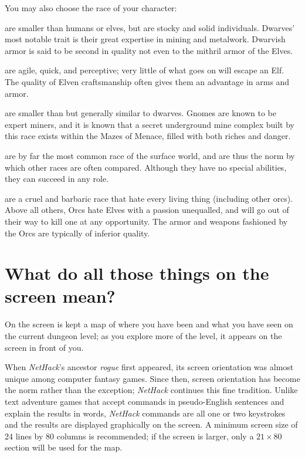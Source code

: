 You may also choose the race of your character:

%
\blist{}
\item[\bb{Dwarves}]%
are smaller than humans or elves, but are stocky and solid
individuals.  Dwarves' most notable trait is their great expertise in mining
and metalwork.  Dwarvish armor is said to be second in quality not even to the
mithril armor of the Elves.
%
\item[\bb{Elves}]%
are agile, quick, and perceptive; very little of what goes
on will escape an Elf.  The quality of Elven craftsmanship often gives
them an advantage in arms and armor.
%
\item[\bb{Gnomes}]%
are smaller than but generally similar to dwarves.  Gnomes are
known to be expert miners, and it is known that a secret underground mine
complex built by this race exists within the Mazes of Menace, filled with
both riches and danger.
%
\item[\bb{Humans}]%
are by far the most common race of the surface world, and
are thus the norm by which other races are often compared.  Although
they have no special abilities, they can succeed in any role.
%
\item[\bb{Orcs}]%
are a cruel and barbaric race that hate every living thing
(including other orcs).  Above all others, Orcs hate Elves with a passion
unequalled, and will go out of their way to kill one at any opportunity.
The armor and weapons fashioned by the Orcs are typically of inferior quality.
\elist

\section{What do all those things on the screen mean?}
On the screen is kept a map of where you have been and what you have 
seen on the current dungeon level; as you explore more of the level, 
it appears on the screen in front of you.

When {\it NetHack\/}'s ancestor {\it rogue\/} first appeared, its screen
orientation was almost unique among computer fantasy games.  Since
then, screen orientation has become the norm rather than the
exception; {\it NetHack\/} continues this fine tradition.  Unlike text
adventure games that accept commands in pseudo-English sentences and
explain the results in words, {\it NetHack\/} commands are all one or two
keystrokes and the results are displayed graphically on the screen.  A
minimum screen size of 24 lines by 80 columns is recommended; if the
screen is larger, only a $21\times80$ section will be used for the map.

